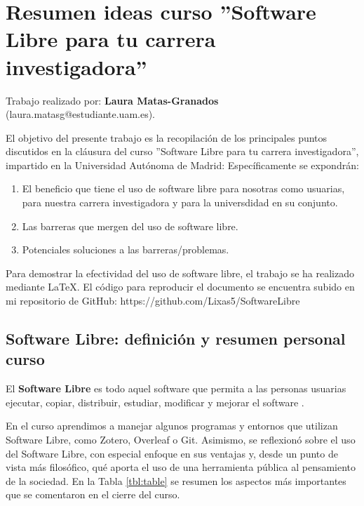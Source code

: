 \documentclass[12pt,a4paper]{article}
\begin{document}
\section*{\centering Resumen ideas curso ''Software Libre para tu carrera investigadora''}

Trabajo realizado por: \textbf{Laura Matas-Granados} (laura.matasg@estudiante.uam.es).

\hspace{10mm}

El objetivo del presente trabajo es la recopilación de los principales puntos discutidos en la cláusura del curso ''Software Libre para tu carrera investigadora'', impartido en la Universidad Autónoma de Madrid: Específicamente se expondrán:

\begin{enumerate}
  \item El beneficio que tiene el uso de software libre para nosotras como usuarias, para nuestra carrera investigadora y para la universdidad en su conjunto.
  \item Las barreras que mergen del uso de software libre.
  \item Potenciales soluciones a las barreras/problemas.
\end{enumerate}
Para demostrar la efectividad del uso de software libre, el trabajo se ha realizado mediante LaTeX. El código para reproducir el documento se encuentra subido en mi repositorio de GitHub: https://github.com/Lixas5/SoftwareLibre

\subsection*{Software Libre: definición y resumen personal curso}

El \textbf{Software Libre} es todo aquel software que permita a las personas usuarias ejecutar, copiar, distribuir, estudiar, modificar y mejorar el software \parencite{free_software_foundation_what_nodate}.

\hspace{10mm}

En el curso aprendimos a manejar algunos programas y entornos que utilizan Software Libre, como Zotero, Overleaf o Git. Asimismo, se reflexionó sobre el uso del Software Libre, con especial enfoque en sus ventajas y, desde un punto de vista más filosófico, qué aporta el uso de una herramienta pública al pensamiento de la sociedad. En la Tabla \ref{tbl:table} se resumen los aspectos más importantes que se comentaron en el cierre del curso. 
\end{document}
